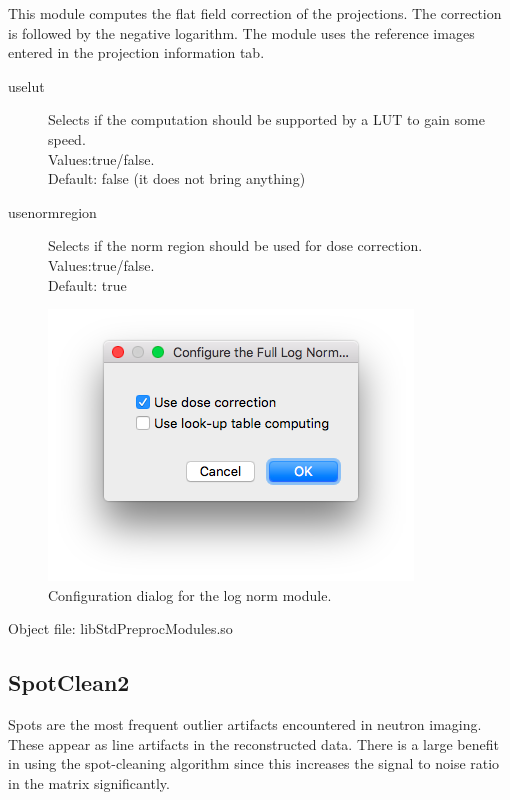 \documentclass[a4paper]{scrreprt}
\begin{document}
This module computes the flat field correction of the projections. The correction is followed by the negative logarithm. The module uses the reference images entered in the projection information tab.
\begin{description}
 \item[uselut] Selects if the computation should be supported by a LUT to gain some speed. \\Values:true/false.\\Default: false (it does not bring anything)
\item[usenormregion] Selects if the norm region should be used for dose correction. \\Values:true/false.\\Default: true
\end{description}
\begin{figure}[ht!]
\centering
\includegraphics[scale=0.5]{figures3/Module_LogNorm.png}
\caption{Configuration dialog for the log norm module.}
\end{figure}
Object file: libStdPreprocModules.so



\subsection{SpotClean2}
Spots are the most frequent outlier artifacts encountered in neutron imaging. These appear as line artifacts in the reconstructed data. There is a large benefit in using the spot-cleaning algorithm since this increases the signal to
noise ratio in the matrix significantly.
\end{document}
